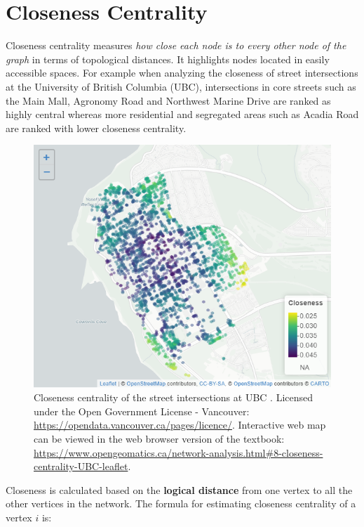 \documentclass[
]{book}
\begin{document}
\section{Closeness Centrality}\label{closeness-centrality}

Closeness centrality measures \emph{how close each node is to every other node of the graph} in terms of topological distances. It highlights nodes located in easily accessible spaces. For example when analyzing the closeness of street intersections at the University of British Columbia (UBC), intersections in core streets such as the Main Mall, Agronomy Road and Northwest Marine Drive are ranked as highly central whereas more residential and segregated areas such as Acadia Road are ranked with lower closeness centrality.



\begin{figure}
\includegraphics[width=8.53in]{images/08-Closeness-centrality-of-the-street-intersections-at-UBC-static} \caption{Closeness centrality of the street intersections at UBC \citep{city_of_vancouver_open_nodate}. Licensed under the Open Government License - Vancouver: \url{https://opendata.vancouver.ca/pages/licence/}. Interactive web map can be viewed in the web browser version of the textbook: \url{https://www.opengeomatics.ca/network-analysis.html\#8-closeness-centrality-UBC-leaflet}.}\label{fig:8-closeness-centrality-UBC-leaflet}
\end{figure}

Closeness is calculated based on the \textbf{logical distance} from one vertex to all the other vertices in the network. The formula for estimating closeness centrality of a vertex \(i\) is:
\end{document}
